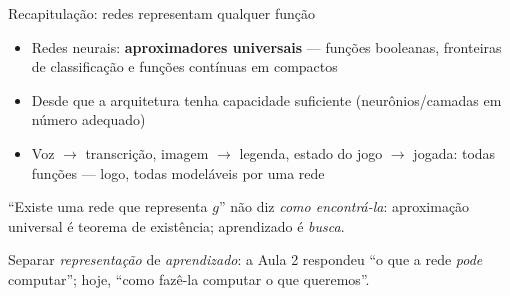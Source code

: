 \documentclass[aspectratio=169, 11pt]{beamer}
\begin{document}
\begin{frame}{Recapitulação: redes representam qualquer função}
  \begin{itemize}\setlength{\itemsep}{0.4ex}
    \item Redes neurais: \textbf{aproximadores universais} — funções booleanas,
          fronteiras de classificação e funções contínuas em compactos
    \item Desde que a arquitetura tenha \alert{capacidade suficiente}
          (neurônios/camadas em número adequado)
    \item Voz $\to$ transcrição, imagem $\to$ legenda, estado do jogo $\to$ jogada:
          todas funções — logo, todas modeláveis por uma rede
  \end{itemize}

  \begin{alertabox}
    ``Existe uma rede que representa $g$'' \alert{não} diz \emph{como encontrá-la}:
    aproximação universal é teorema de existência; aprendizado é \emph{busca}.
  \end{alertabox}

  \begin{ideiabox}
    Separar \emph{representação} de \emph{aprendizado}: a Aula 2 respondeu
    ``o que a rede \emph{pode} computar''; hoje, ``como fazê-la computar o que
    queremos''.
  \end{ideiabox}
\end{frame}
\end{document}
